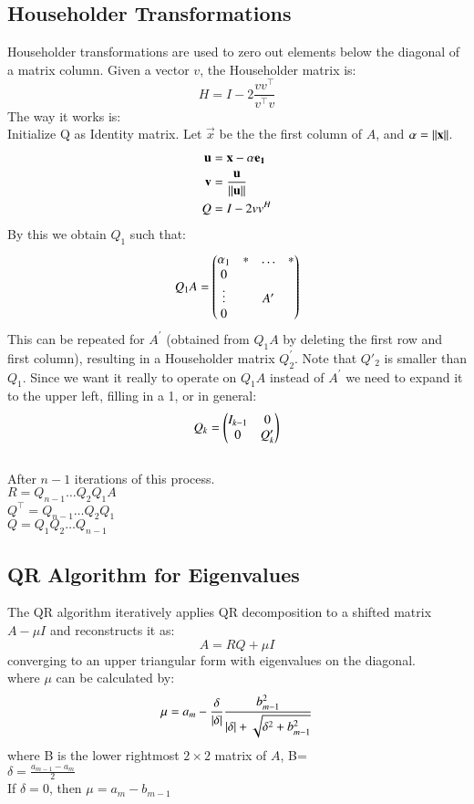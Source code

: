 \documentclass[journal,12pt,onecolumn]{IEEEtran}
\theoremstyle{remark}
\begin{document}
\subsection{Householder Transformations}
Householder transformations are used to zero out elements below the diagonal of a matrix column. Given a vector $v$, the Householder matrix is:
$$H = I - 2\frac{vv^\top}{v^\top v}$$
The way it works is:\\
Initialize Q as Identity matrix. Let $\vec{x}$ be the the first column of $A$, and $\alpha=\left\lVert\mathbf{x}\right\rVert$.\\
\begin{align*}
    \mathbf{u}&=\mathbf{x}-\alpha\mathbf{e_1}\\
    \mathbf{v}&=\frac{\mathbf{u}}{\left\lVert\mathbf{u}\right\rVert}\\
    Q&=I-2vv^H
\end{align*}
By this we obtain $Q_1$ such that:\\
$$Q_1A=\begin{pmatrix}\alpha_1 & * & \dots & *\\ 0 & & &\\\vdots & & A^\prime &\\0 & & &\end{pmatrix}$$
This can be repeated for $A^\prime$ (obtained from $Q_1A$ by deleting the first row and first column), resulting in a Householder matrix $Q^\prime_2$. Note that $Q\prime_2$ is smaller than $Q_1$. Since we want it really to operate on $Q_1A$ instead of $A^\prime$ we need to expand it to the upper left, filling in a 1, or in general:
$$Q_k=\begin{pmatrix}I_{k-1} & 0 \\ 0 & Q^\prime_k\end{pmatrix}$$\\
After $n-1$ iterations of this process.\\
$R=Q_{n-1}\dots Q_2Q_1A$\\
$Q^\top=Q_{n-1}\dots Q_2Q_1$\\
$Q=Q_1Q_2\dots Q_{n-1}$
\subsection{QR Algorithm for Eigenvalues}
The QR algorithm iteratively applies QR decomposition to a shifted matrix \( A - \mu I \) and reconstructs it as:
$$A = RQ + \mu I$$
converging to an upper triangular form with eigenvalues on the diagonal.\\
where $\mu$ can be calculated by:\\
$$\mu=a_m-\frac{\delta}{\left\vert\delta\right\vert}\frac{b^2_{m-1}}{\left\vert\delta\right\vert+\sqrt{\delta^2+b^2_{m-1}}}$$
where B is the lower rightmost $2\times 2$ matrix of $A$, B= \\
$\delta=\frac{a_{m-1}-a_m}{2}$\\
If $\delta=0$, then $\mu=a_m-b_{m-1}$
\end{document}
